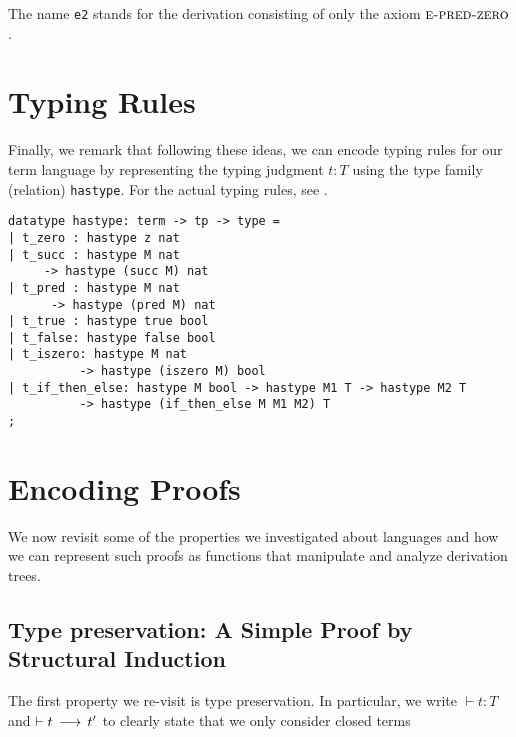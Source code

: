 The name \lstinline!e2! stands for the derivation consisting of only
the axiom $\textsc{e-pred-zero}$.

\section{Typing Rules}
Finally, we remark that following these ideas, we can encode typing rules for
our term language by representing the typing judgment $t : T$ using the type
family (relation) \lstinline!hastype!. For the actual typing rules,
see \cite[Ch ?, Fig. ?]{TAPL}.


\begin{lstlisting}
datatype hastype: term -> tp -> type =
| t_zero : hastype z nat
| t_succ : hastype M nat
     -> hastype (succ M) nat
| t_pred : hastype M nat
      -> hastype (pred M) nat
| t_true : hastype true bool
| t_false: hastype false bool
| t_iszero: hastype M nat
          -> hastype (iszero M) bool
| t_if_then_else: hastype M bool -> hastype M1 T -> hastype M2 T
          -> hastype (if_then_else M M1 M2) T
;
\end{lstlisting}



\section{Encoding Proofs}
We now revisit some of the properties we investigated about languages
and how we can represent such proofs as functions that manipulate and
analyze derivation trees.

\subsection{Type preservation: A Simple Proof by Structural Induction} The first property we re-visit is type
preservation. In particular, we write $\vdash t : T$ and $\vdash t
\mathrel{\,\longrightarrow\,} t'$ to clearly state that we only consider closed terms

